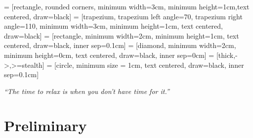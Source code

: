 
\usepackage{makecell}
\setlength{\parindent}{0pt}
\usepackage{float}

\usetikzlibrary{shapes.geometric, arrows}
     = [rectangle, rounded corners, minimum width=3cm, minimum height=1cm,text centered, draw=black]
     = [trapezium, trapezium left angle=70, trapezium right angle=110, minimum width=3cm, minimum height=1cm, text centered, draw=black]
     = [rectangle, minimum width=2cm, minimum height=1cm, text centered, draw=black, inner sep=0.1cm]
     = [diamond, minimum width=2cm, minimum height=0cm, text centered, draw=black, inner sep=0cm]
     = [thick,->,>=stealth]
     = [circle, minimum size = 1cm, text centered, draw=black, inner sep=0.1cm]

\renewcommand{\docTitle}{Lecture 3 - Branch and Bound}
\renewcommand{\docAuthor}{Lan Peng, Ph.D.}
\renewcommand{\docAffil}{School of Management, Shanghai University, Shanghai, China}

    \titleSec

    \begin{center}
        \textit{``The time to relax is when you don't have time for it.''}
    \end{center}

    \section{Preliminary}
